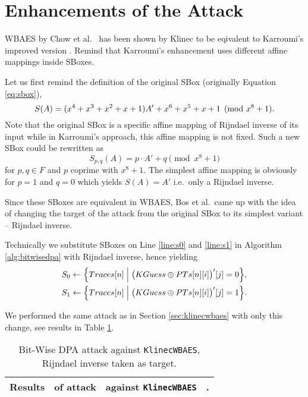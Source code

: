 \section{Enhancements of the Attack}   %

WBAES by Chow et al.\ \cite{chow2003aes} has been shown by Klinec \cite{klinec2013white} to be eqivalent to Karroumi's improved version \cite{karroumi2011protecting}. Remind that Karroumi's enhancement uses different affine mappings inside SBoxes.

Let us first remind the definition of the original SBox (originally Equation \ref{eq:sbox}),
\[
	S(A) = (x^4 + x^3 + x^2 + x + 1)A' + x^6 + x^5 + x + 1 \pmod{x^8+1} .
\]
Note that the original SBox is a specific affine mapping of Rijndael inverse of its input while in Karroumi's approach, this affine mapping is not fixed. Such a new SBox could be rewritten as
\begin{equation}
	S_{p,q}(A) = p\cdot A' + q \pmod{x^8+1}
\end{equation}
for $p,q\in F$ and $p$ coprime with $x^8+1$. The simplest affine mapping is obviously for $p=1$ and $q=0$ which yields $S(A) = A'$ i.e.\ only a Rijndael inverse.

Since these SBoxes are equivalent in WBAES, Bos et al.\ came up with the idea of changing the target of the attack from the original SBox to its simplest variant -- Rijndael inverse.

\begin{remark}
	Technically we substitute SBoxes on Line \ref{line:s0} and \ref{line:s1} in Algorithm \ref{alg:bitwisedpa} with Rijndael inverse, hence yielding
	\begin{align*}
		S_0 &\gets \Bigl\{ Traces[n] \Bigm| \bigl(KGuess\oplus PTs[n][i]\bigr)'[j] = 0 \Bigr\} , \\
		S_1 &\gets \Bigl\{ Traces[n] \Bigm| \bigl(KGuess\oplus PTs[n][i]\bigr)'[j] = 1 \Bigr\} .
	\end{align*}
\end{remark}

We performed the same attack as in Section \ref{sec:klinecwbaes} with only this change, see results in Table \ref{tab:klinecrijinv}.

\begin{table}[H]
	\begin{center}
	\begin{tabular}{| c | c | c | c |}
		\hline
		Results & of attack & against {\tt KlinecWBAES} & . \\
		\hline
	\end{tabular}
	\end{center}
\caption{Bit-Wise DPA attack against {\tt KlinecWBAES}, Rijndael inverse taken as target.}
\label{tab:klinecrijinv}
\end{table}

